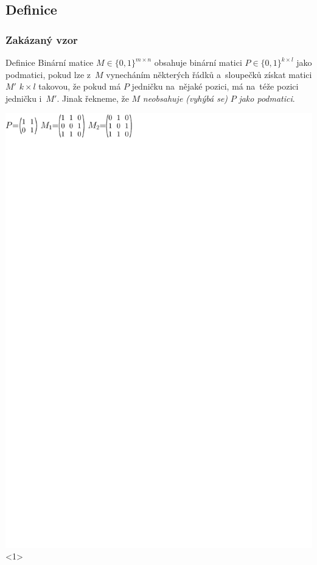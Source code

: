 \documentclass{beamer}
\begin{document}
\subsection{Definice}
\begin{frame}
\frametitle{Zakázaný vzor}
\begin{block}{Definice}
Binární matice $M\in\{0,1\}^{m\times n}$ \alert{obsahuje} binární matici $P\in\{0,1\}^{k\times l}$ \alert{jako podmatici}, pokud lze z~$M$ vynecháním některých řádků a~sloupečků získat matici $M'$ $k\times l$ takovou, že pokud má $P$ jedničku na~nějaké pozici, má na~téže pozici jedničku i~$M'$. Jinak řekneme, že $M$ \emph{neobsahuje (vyhýbá se)} $P$ \emph{jako podmatici}.
\end{block}
\vspace{5mm}
\centering
\includegraphics{../img/example.pdf}<1>

\end{frame}
\end{document}
